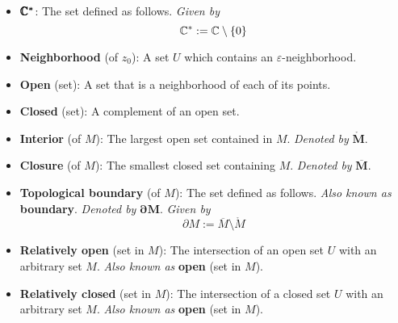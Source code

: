 \documentclass[../notes.tex]{subfiles}
\begin{document}
\begin{itemize}
\begin{equation*}
    \end{equation*}
    \item $\bm{\pmb{\mathbb{C}}^*}$: The set defined as follows. \emph{Given by}
    \begin{equation*}
        \mathbb{C}^* := \mathbb{C}\setminus\{0\}
    \end{equation*}
    \item {}\textbf{Neighborhood} (of $z_0$): A set $U$ which contains an $\varepsilon$-neighborhood.
    \item \textbf{Open} (set): A set that is a neighborhood of each of its points.
    \item \textbf{Closed} (set): A complement of an open set.
    \item \textbf{Interior} (of $M$): The largest open set contained in $M$. \emph{Denoted by} $\bm{\mathring{M}}$.
    \item \textbf{Closure} (of $M$): The smallest closed set containing $M$. \emph{Denoted by} $\bm{\overline{M}}$.
    \item \textbf{Topological boundary} (of $M$): The set defined as follows. \emph{Also known as} \textbf{boundary}. \emph{Denoted by} $\bm{\partial M}$. \emph{Given by}
    \begin{equation*}
        \partial M := \overline{M}\setminus\mathring{M}
    \end{equation*}
    \item \textbf{Relatively open} (set in $M$): The intersection of an open set $U$ with an arbitrary set $M$. \emph{Also known as} \textbf{open} (set in $M$).
    \item \textbf{Relatively closed} (set in $M$): The intersection of a closed set $U$ with an arbitrary set $M$. \emph{Also known as} \textbf{open} (set in $M$).
\end{itemize}
\end{document}
